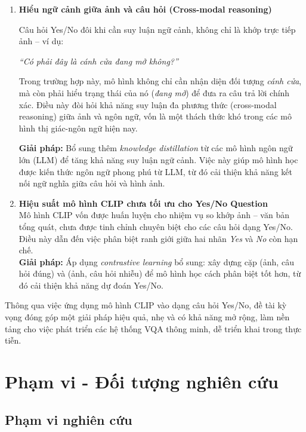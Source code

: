 \begin{enumerate}
    \item \textbf{Hiểu ngữ cảnh giữa ảnh và câu hỏi (Cross-modal reasoning)} 
    
    Câu hỏi Yes/No đôi khi cần suy luận ngữ cảnh, không chỉ là khớp trực tiếp ảnh – ví dụ: 
    
    \textit{“Có phải đây là cánh cửa đang mở không?”}
    
    Trong trường hợp này, mô hình không chỉ cần nhận diện đối tượng \textit{cánh cửa}, mà còn phải hiểu trạng thái của nó (\textit{đang mở}) để đưa ra câu trả lời chính xác. Điều này đòi hỏi khả năng suy luận đa phương thức (cross-modal reasoning) giữa ảnh và ngôn ngữ, vốn là một thách thức khó trong các mô hình thị giác-ngôn ngữ hiện nay. 
    
    \textbf{Giải pháp:} Bổ sung thêm \textit{knowledge distillation} từ các mô hình ngôn ngữ lớn (LLM) để tăng khả năng suy luận ngữ cảnh. Việc này giúp mô hình học được kiến thức ngôn ngữ phong phú từ LLM, từ đó cải thiện khả năng kết nối ngữ nghĩa giữa câu hỏi và hình ảnh.

    \item \textbf{Hiệu suất mô hình CLIP chưa tối ưu cho Yes/No Question} \\
    Mô hình CLIP vốn được huấn luyện cho nhiệm vụ so khớp ảnh -- văn bản tổng quát, chưa được tinh chỉnh chuyên biệt cho các câu hỏi dạng Yes/No. Điều này dẫn đến việc phân biệt ranh giới giữa hai nhãn \textit{Yes} và \textit{No} còn hạn chế. \\ 
    \textbf{Giải pháp:} Áp dụng \textit{contrastive learning} bổ sung: xây dựng cặp (ảnh, câu hỏi đúng) và (ảnh, câu hỏi nhiễu) để mô hình học cách phân biệt tốt hơn, từ đó cải thiện khả năng dự đoán Yes/No.
\end{enumerate}




Thông qua việc ứng dụng mô hình CLIP vào dạng câu hỏi Yes/No, đề tài kỳ vọng đóng góp một giải pháp hiệu quả, nhẹ và có khả năng mở rộng, làm nền tảng cho việc phát triển các hệ thống VQA thông minh, dễ triển khai trong thực tiễn.
\section{Phạm vi - Đối tượng nghiên cứu}

\subsection{Phạm vi nghiên cứu}

